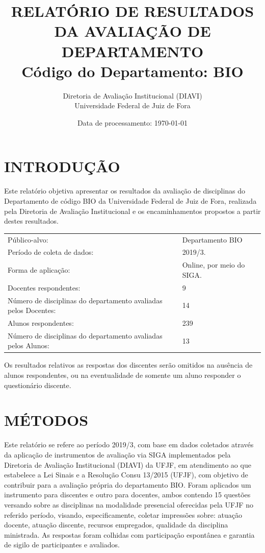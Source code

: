 \documentclass[a4paper,10pt]{article}
\date{Data de processamento: \today}
\begin{document}
\author{Diretoria de Avaliação Institucional (DIAVI) \\ Universidade Federal de Juiz de Fora}

\title{RELATÓRIO DE RESULTADOS DA AVALIAÇÃO DE DEPARTAMENTO\\ Código do Departamento: BIO}
\maketitle
\section{INTRODUÇÃO}
Este relatório objetiva apresentar os resultados da avaliação de disciplinas do Departamento     de código BIO da Universidade Federal de Juiz de Fora, realizada pela     Diretoria de Avaliação Institucional e os encaminhamentos propostos a     partir destes resultados.

\begin{center}
\begin{tabularx}{\linewidth}{X|l}

Público-alvo:& Departamento  BIO\\

Período de coleta de dados:& 2019/3.\\

Forma de aplicação:& Online, por meio do SIGA.\\

Docentes respondentes:& 9\\

Número de disciplinas do departamento avaliadas pelos Docentes:& 14\\

Alunos   respondentes:& 239\\

Número de disciplinas do departamento  avaliadas pelos   Alunos:& 13\\
\end{tabularx}
\end{center}

Os resultados relativos as respostas dos discentes serão omitidos na ausência de alunos respondentes, ou na eventualidade de somente um aluno responder o questionário discente.
\section{MÉTODOS}
Este relatório se refere ao período 2019/3, com base em dados     coletados através da aplicação de instrumentos de avaliação via SIGA     implementados pela Diretoria de Avaliação Institucional (DIAVI) da UFJF, em atendimento     ao que estabelece a Lei Sinais e a Resolução Consu 13/2015 (UFJF),     com objetivo de contribuir para a avaliação própria do departamento BIO.    Foram aplicados um instrumento para discentes e outro para docentes, ambos contendo     15 questões versando sobre as disciplinas na modalidade presencial oferecidas pela UFJF no     referido período, visando, especificamente, coletar impressões sobre: atuação docente, atuação discente,     recursos empregados, qualidade da disciplina ministrada.     As respostas foram colhidas      com participação espontânea e garantia de    sigilo de participantes e avaliados.
\end{document}
